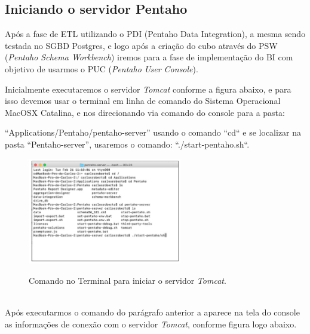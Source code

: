 \subsection{Iniciando o servidor Pentaho}

Ap\'os a fase de ETL utilizando o PDI (Pentaho Data Integration), a mesma sendo testada no SGBD Postgres, 
e logo ap\'os a cria\c{c}\~{a}o do cubo atrav\'{e}s do PSW (\textit{Pentaho Schema Workbench}) iremos para a fase de implementa\c{c}\~{a}o do BI com objetivo de usarmos o PUC (\textit{Pentaho User Console}).

Inicialmente executaremos o servidor \textit{Tomcat} conforme a figura abaixo, 
e para isso devemos usar o terminal em linha de comando do Sistema Operacional MacOSX Catalina, e 
nos direcionando via comando do console para a pasta:

``Applications/Pentaho/pentaho-server'' usando o comando ``cd`` e se 
localizar na pasta ``Pentaho-server'', usaremos o comando: ``./start-pentaho.sh``.

\begin{figure}[H]
	\vspace*{0,2cm}
    \centering
    \caption{Comando no Terminal para iniciar o servidor \textit{Tomcat}.}
    \includegraphics[width=0.6\textwidth]{./04-figuras/figura-pserver}
    \label{fig:ilustfigpserver}
\end{figure}
\vspace*{-0,9cm}
{\raggedright {}} \\

Ap\'os executarmos o comando do par\'{a}grafo anterior a aparece na tela do console as informa\c{c}\~{o}es de 
conex\~{a}o com o servidor \textit{Tomcat}, conforme figura logo abaixo.

